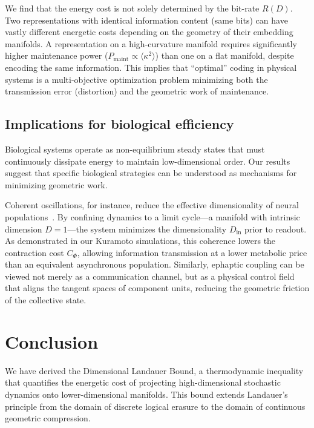\documentclass[aps,pre,twocolumn,superscriptaddress,floatfix]{revtex4-2}
\begin{document}
We find that the energy cost is not solely determined by the bit-rate $R(D)$. Two representations with identical information content (same bits) can have vastly different energetic costs depending on the geometry of their embedding manifolds. A representation on a high-curvature manifold requires significantly higher maintenance power ($P_{\text{maint}} \propto \langle \kappa^2 \rangle$) than one on a flat manifold, despite encoding the same information. This implies that ``optimal'' coding in physical systems is a multi-objective optimization problem minimizing both the transmission error (distortion) and the geometric work of maintenance.

\subsection{Implications for biological efficiency}

Biological systems operate as non-equilibrium steady states that must continuously dissipate energy to maintain low-dimensional order. Our results suggest that specific biological strategies can be understood as mechanisms for minimizing geometric work.

Coherent oscillations, for instance, reduce the effective dimensionality of neural populations~\cite{buzsaki2006,fries2015}. By confining dynamics to a limit cycle---a manifold with intrinsic dimension $D=1$---the system minimizes the dimensionality $D_{\text{in}}$ prior to readout. As demonstrated in our Kuramoto simulations, this coherence lowers the contraction cost $C_\Phi$, allowing information transmission at a lower metabolic price than an equivalent asynchronous population. Similarly, ephaptic coupling can be viewed not merely as a communication channel, but as a physical control field that aligns the tangent spaces of component units, reducing the geometric friction of the collective state.

\section{Conclusion}

We have derived the Dimensional Landauer Bound, a thermodynamic inequality that quantifies the energetic cost of projecting high-dimensional stochastic dynamics onto lower-dimensional manifolds. This bound extends Landauer's principle from the domain of discrete logical erasure to the domain of continuous geometric compression.
\end{document}
